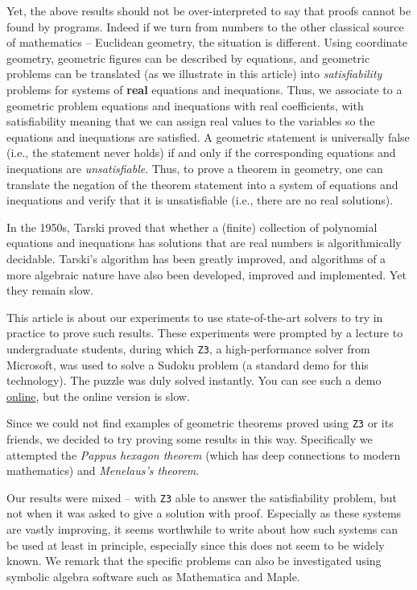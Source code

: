 \documentclass{amsart}
\theoremstyle{plain}
\theoremstyle{definition}
\theoremstyle{remark}
\begin{document}
Yet, the above results should not be over-interpreted to say that proofs
cannot be found by programs. Indeed if we turn from numbers to the other
classical source of mathematics -- Euclidean geometry, the situation is
different. Using coordinate geometry, geometric figures can be described by equations,
and geometric problems can be translated (as we illustrate in this article) into
\emph{satisfiability} problems for systems of \textbf{real} equations and inequations. Thus, we
associate to a geometric problem equations and inequations with real coefficients,
with satisfiability meaning that we can
assign real values to the variables so the equations and inequations are satisfied.
A geometric statement is universally false (i.e., the statement never holds) if and only if the corresponding equations and inequations are \emph{unsatisfiable}. Thus, to prove a theorem in geometry, one can translate the negation of the theorem statement into a system of equations and inequations and verify that it is unsatisfiable (i.e., there are no real solutions).

In the 1950s, Tarski proved that whether a (finite)
collection of polynomial equations and inequations has solutions that
are real numbers is algorithmically decidable.  Tarski's algorithm has been greatly improved,
and algorithms of a more algebraic nature have also been developed,
improved and implemented. Yet they remain slow.

This article is about our experiments to use
state-of-the-art solvers to try in practice to prove such results.
These experiments were prompted by a lecture
to undergraduate students, during which \texttt{Z3}, a high-performance
solver from Microsoft, was used to solve a Sudoku problem (a standard demo for
this technology). The puzzle was duly solved instantly. You can see such
a demo \href{https://rise4fun.com/Z3/Cs7p}{online}, but the online
version is slow.

Since we could not find examples of geometric theorems proved using \texttt{Z3} or
its friends, we decided to try proving
some results in this way. Specifically we attempted the \emph{Pappus hexagon theorem}
(which has deep connections to modern mathematics) and \emph{Menelaus's theorem}.

Our results were mixed -- with \texttt{Z3} able to answer the satisfiability problem,
but not when it was asked to give a solution with proof.
Especially as these systems are vastly improving, it seems worthwhile to
write about how such systems can be used at least in principle,
especially since this does not seem to be widely known. We remark that the 
specific problems can also be investigated using symbolic algebra software such 
as Mathematica and Maple.
\end{document}
